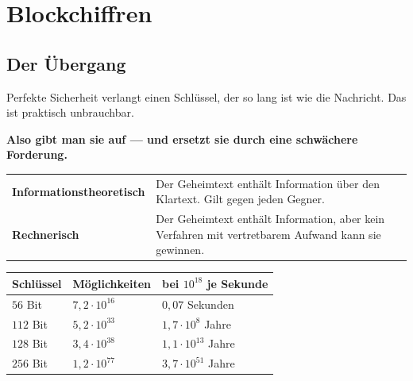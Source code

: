 \chapter{Blockchiffren}

\section{Der Übergang}

\begin{merksatz}
Perfekte Sicherheit verlangt einen Schlüssel, der so lang ist wie die Nachricht. Das ist praktisch unbrauchbar.

\begin{center}
\begin{minipage}{0.9\textwidth}
\textbf{Also gibt man sie auf --- und ersetzt sie durch eine schwächere Forderung.}
\end{minipage}
\end{center}

\begin{center}
{\small
\renewcommand{\arraystretch}{1.55}
\begin{tabular}{@{}P{2.6cm}P{6.0cm}@{}}
\toprule
\textbf{Informations\-theoretisch} & Der Geheimtext enthält  Information über den Klartext. Gilt gegen jeden Gegner.\\
\textbf{Rechnerisch} & Der Geheimtext enthält Information, aber kein Verfahren mit vertretbarem Aufwand kann sie gewinnen.\\
\bottomrule
\end{tabular}}
\end{center}

\begin{center}
\begin{minipage}{0.88\textwidth}
\end{minipage}
\end{center}

\begin{center}
{\small
\renewcommand{\arraystretch}{1.48}
\begin{tabular}{@{}P{1.8cm}P{2.2cm}P{3.2cm}@{}}
\toprule
\textbf{Schlüssel} & \textbf{Möglich\-keiten} & \textbf{bei $10^{18}$ je Sekunde}\\
\midrule
$56$ Bit & $7{,}2\cdot10^{16}$ & $0{,}07$ Sekunden\\
$112$ Bit & $5{,}2\cdot10^{33}$ & $1{,}7\cdot10^{8}$ Jahre\\
$128$ Bit & $3{,}4\cdot10^{38}$ & $1{,}1\cdot10^{13}$ Jahre\\
$256$ Bit & $1{,}2\cdot10^{77}$ & $3{,}7\cdot10^{51}$ Jahre\\
\bottomrule
\end{tabular}}
\end{center}


\end{merksatz}

